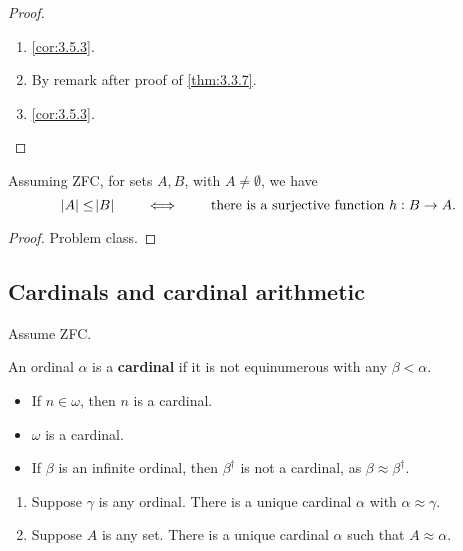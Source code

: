 \begin{proof}
\hfill
\begin{enumerate}
\item \ref{cor:3.5.3}.
\item By remark after proof of \ref{thm:3.3.7}.
\item \ref{cor:3.5.3}.
\end{enumerate}
\end{proof}

\begin{lemma}
\label{lem:4.1.7}
Assuming ZFC, for sets $ A, B $, with $ A \ne \emptyset $, we have
$$ \abs{A} \le \abs{B} \qquad \iff \qquad \text{there is a surjective function} \ h : B \to A. $$
\end{lemma}

\begin{proof}
Problem class.
\end{proof}

\pagebreak

\subsection{Cardinals and cardinal arithmetic}

Assume ZFC.

\begin{definition}
An ordinal $ \alpha $ is a \textbf{cardinal} if it is not equinumerous with any $ \beta < \alpha $.
\end{definition}

\begin{example*}
\hfill
\begin{itemize}
\item If $ n \in \omega $, then $ n $ is a cardinal.
\item $ \omega $ is a cardinal.
\item If $ \beta $ is an infinite ordinal, then $ \beta^\dagger $ is not a cardinal, as $ \beta \approx \beta^\dagger $.
\end{itemize}
\end{example*}

\begin{lemma}
\hfill
\begin{enumerate}
\item Suppose $ \gamma $ is any ordinal. There is a unique cardinal $ \alpha $ with $ \alpha \approx \gamma $.
\item Suppose $ A $ is any set. There is a unique cardinal $ \alpha $ such that $ A \approx \alpha $.
\end{enumerate}
\end{lemma}

